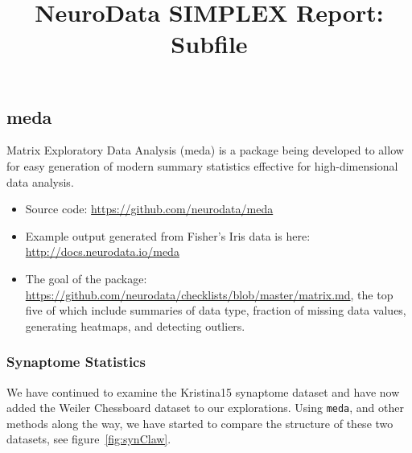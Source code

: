 \documentclass[simplex.tex]{subfiles}
\title{NeuroData SIMPLEX Report: Subfile}
\begin{document}


\subsection{meda}

Matrix Exploratory Data Analysis (meda) is a package being developed to
allow for easy generation of modern summary statistics effective for
high-dimensional data analysis. 

\begin{itemize}
  \item Source code: \href{https://github.com/neurodata/meda}{https://github.com/neurodata/meda}
  \item Example output generated from Fisher's Iris data is here:
    \href{http://docs.neurodata.io/meda}{http://docs.neurodata.io/meda}
  \item The goal of the package:
    \href{https://github.com/neurodata/checklists/blob/master/matrix.md}{https://github.com/neurodata/checklists/blob/master/matrix.md}, the top five of which include summaries of data type, fraction of missing data values, generating heatmaps, and detecting outliers.
\end{itemize}

\subsubsection{Synaptome Statistics}

We have continued to examine the Kristina15 synaptome dataset and have
now added the Weiler Chessboard dataset to our explorations.  Using 
\verb+meda+, and other methods along the way, we have started to compare
the structure of these two datasets, see figure~\ref{fig:synClaw}.  
\end{document}
